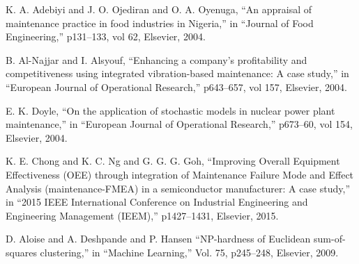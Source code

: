 \documentclass[conference]{IEEEtran}
\begin{document}
\begin{thebibliography}{00}
	 K. A. Adebiyi and J. O. Ojediran and O. A. Oyenuga, ``An appraisal of maintenance practice in food industries in Nigeria,'' in ``Journal of Food Engineering,'' p131--133, vol 62, Elsevier, 2004.

	 B. Al-Najjar and I. Alsyouf, ``Enhancing a company's profitability and competitiveness using integrated vibration-based maintenance: A case study,'' in ``European Journal of Operational Research,'' p643--657, vol 157, Elsevier, 2004.

	 E. K. Doyle, ``On the application of stochastic models in nuclear power plant maintenance,'' in ``European Journal of Operational Research,'' p673--60, vol 154, Elsevier, 2004.

	 K. E. Chong and K. C. Ng and G. G. G. Goh, ``Improving Overall Equipment Effectiveness (OEE) through integration of Maintenance Failure Mode and Effect Analysis (maintenance-FMEA) in a semiconductor manufacturer: A case study,'' in ``2015 IEEE International Conference on Industrial Engineering and Engineering Management (IEEM),'' p1427--1431, Elsevier, 2015.

	 D. Aloise and A. Deshpande and P. Hansen ``NP-hardness of Euclidean sum-of-squares clustering,'' in ``Machine Learning,'' Vol. 75, p245--248, Elsevier, 2009.
	
\end{thebibliography}
\end{document}
